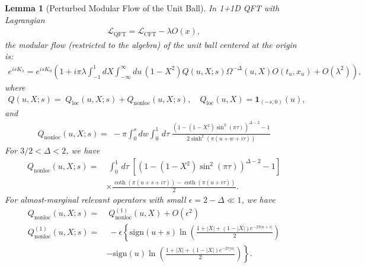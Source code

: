 \documentclass[a4paper,11pt]{article}
\newtheorem{lemma}[theorem]{Lemma}
\theoremstyle{definition}
\theoremstyle{remark}
\newcommand{\ep}{\epsilon}
\newcommand{\KL}[1]{\textcolor{brown}{#1}}
\begin{document}
\begin{lemma} [Perturbed Modular Flow of the Unit Ball]
    In 1+1D QFT with Lagrangian
    \begin{align}
        \mathcal{L}_\text{QFT} = \mathcal{L}_\text{CFT} - \lambda O(x),  
    \end{align}
    the modular flow (restricted to the algebra) of the unit ball centered at the origin is:
    \begin{gather}
        e^{is K_\lambda } = e^{is K_0} \left(1 + i\pi \lambda \int_{-1}^1 dX \int_{-\infty}^{\infty} du \, (1-X^2) Q(u,X;s) \Omega^{-\Delta}(u,X) O(t_u,x_u) +O(\lambda^2)\right),
    \end{gather}
    where
    \begin{gather}
        Q(u,X;s) =\; Q_{\text{loc}}(u,X;s) + Q_{\text{nonloc}}(u,X;s), \quad Q_{\text{loc}}(u,X) = \textbf{1}_{(-s,0)}(u),
    \end{gather}
    and 
    \begin{align}
        Q_{\text{nonloc}}(u,X;s) =\; -\pi\int_0^s dw\int_0^1 \, d\tau  \;\frac{\left(1 - (1-X^2)\sin^2(\pi \tau)\right)^{\Delta-2} -1}{2\sinh^2(\pi (u+w+i\tau))}
    \end{align}
    For $3/2<\Delta <2$, we have
    \begin{align}
        Q_{\text{nonloc}}(u,X;s) =&\; \int_0^1 \, d\tau \; \left[\left(1 - (1-X^2)\sin^2(\pi \tau)\right)^{\Delta-2} -1\right] \nonumber\\
        &\times\frac{\coth(\pi(u+s+i\tau)) - \coth(\pi(u+i\tau))}{2}.
    \end{align}
    For almost-marginal relevant operators with small $\ep = 2- \Delta \ll 1$, we have
    \begin{align}
        Q_{\text{nonloc}}(u,X;s) =&\; Q^{(1)}_{\text{nonloc}}(u,X) + O(\epsilon^2)\\
        Q^{(1)}_{\text{nonloc}}(u,X;s) =&\; -\epsilon\left\{ \text{sign}(u+s)\ln\left(\frac{1+|X| +(1-|X|)e^{-2\pi|u+s|}}{2}\right) \right. \nonumber\\
        & \left.- \text{sign}(u)\ln\left(\frac{1+|X| +(1-|X|)e^{-2\pi|u|}}{2}\right) \right\}.
    \end{align}
\end{lemma}
\end{document}
